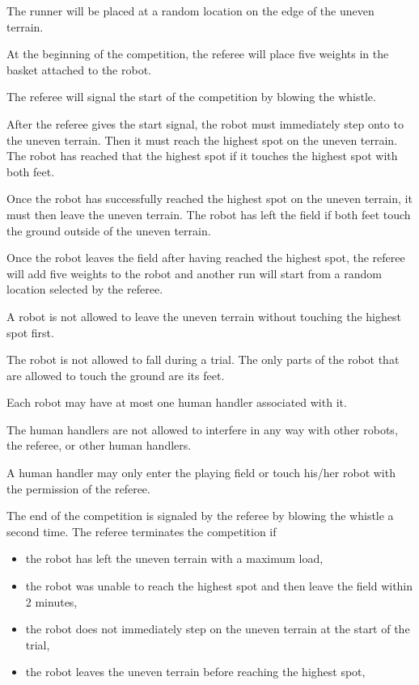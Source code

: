 \documentclass[12pt]{hurocup}
\begin{document}
\begin{lawlist}[LC]
\item The runner will be placed at a random location on the edge of
  the uneven terrain. 

\item At the beginning of the competition, the referee will place five
  weights in the basket attached to the robot.

\item The referee will signal the start of the competition by blowing
  the whistle.

\item After the referee gives the start signal, the robot must
  immediately step onto to the uneven terrain. Then it must reach the
  highest spot on the uneven terrain. The robot has reached that the
  highest spot if it touches the highest spot with both feet.

\item Once the robot has successfully reached the highest spot on the
  uneven terrain, it must then leave the uneven terrain. The robot has
  left the field if both feet touch the ground outside of the uneven
  terrain.

\item Once the robot leaves the field after having reached the highest
  spot, the referee will add five weights to the robot and another run
  will start from a random location selected by the referee.

\item A robot is not allowed to leave the uneven terrain without
  touching the highest spot first.

\item The robot is not allowed to fall during a trial. The only parts
  of the robot that are allowed to touch the ground are its feet.

\item Each robot may have at most one human handler associated with
  it.

\item \label{lc-handler5} The human handlers are not allowed to
  interfere in any way with other robots, the referee, or other human
  handlers.

\item \label{lc-handler6} A human handler may only enter the playing
  field or touch his/her robot with the permission of the referee.

\item The end of the competition is signaled by the referee by
  blowing the whistle a second time.
  The referee terminates the competition if
  \begin{itemize}
  \item the robot has left the uneven terrain with a maximum load,
  \item the robot was unable to reach the highest spot and then leave
    the field within 2 minutes,
  \item the robot does not immediately step on the uneven terrain at
      the start of the trial,
  \item the robot leaves the uneven terrain before reaching the
    highest spot,
  \end{itemize}


\end{lawlist}
\end{document}
